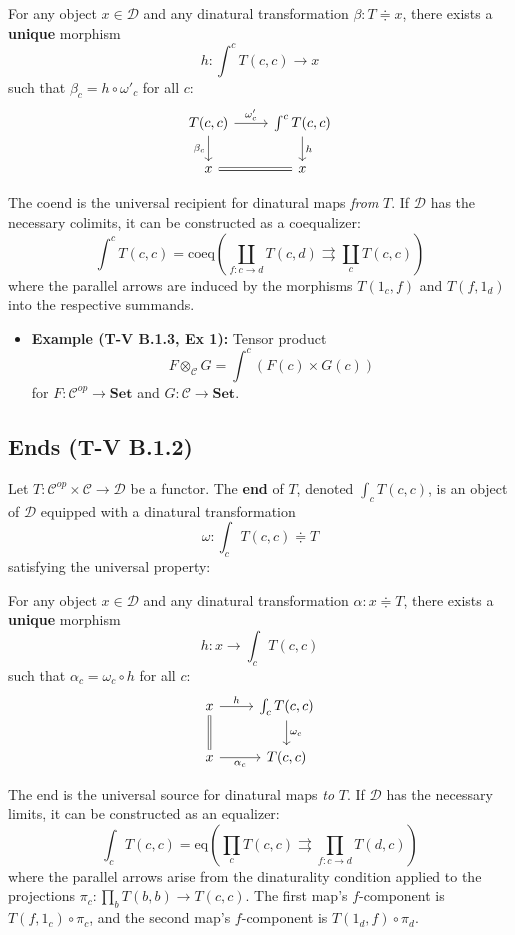 \documentclass[11pt]{article}
\theoremstyle{definition}
\begin{document}
For any object \( x \in \mathcal{D} \) and any dinatural transformation \(\beta : T \Doteq x\), there exists a \textbf{unique} morphism 
\[
h : \int^c T(c, c) \to x
\]
such that \(\beta_c = h \circ \omega'_c\) for all \(c\):
\[
\begin{tikzcd}
T(c,c) \arrow[r, "{\omega'_c}"] \arrow[d, "{\beta_c}"'] & \int^c T(c,c) \arrow[d, "h"] \\
x \arrow[r, equal] & x
\end{tikzcd}
\]

The coend is the universal recipient for dinatural maps \emph{from} \(T\). If \(\mathcal{D}\) has the necessary colimits, it can be constructed as a coequalizer:
\[
\int^c T(c, c) = \mathrm{coeq} \left( \coprod_{f: c \to d} T(c, d) \rightrightarrows \coprod_c T(c,c) \right)
\]
where the parallel arrows are induced by the morphisms \(T(1_c,f)\) and \(T(f,1_d)\) into the respective summands.

\begin{itemize}
    \item \textbf{Example (T-V B.1.3, Ex 1):} Tensor product
    \[
    F \otimes_{\mathcal{C}} G = \int^c (F(c) \times G(c))
    \]
    for \(F: \mathcal{C}^{op} \to \mathbf{Set}\) and \(G: \mathcal{C} \to \mathbf{Set}\).
\end{itemize}

\subsection*{Ends (T-V B.1.2)}

Let \( T: \mathcal{C}^{op} \times \mathcal{C} \to \mathcal{D} \) be a functor. The \textbf{end} of \(T\), denoted \(\int_c T(c, c)\), is an object of \(\mathcal{D}\) equipped with a dinatural transformation
\[
\omega : \int_c T(c, c) \Doteq T
\]
satisfying the universal property:

For any object \( x \in \mathcal{D} \) and any dinatural transformation \(\alpha : x \Doteq T\), there exists a \textbf{unique} morphism 
\[
h : x \to \int_c T(c, c)
\]
such that \(\alpha_c = \omega_c \circ h\) for all \(c\):
\[
\begin{tikzcd}
x \arrow[r, "h"] \arrow[d, equal] & \int_c T(c,c) \arrow[d, "\omega_c"] \\
x \arrow[r, "{\alpha_c}"'] & T(c,c)
\end{tikzcd}
\]

The end is the universal source for dinatural maps \emph{to} \(T\). If \(\mathcal{D}\) has the necessary limits, it can be constructed as an equalizer:
\[
\int_c T(c, c) = \mathrm{eq} \left( \prod_c T(c,c) \rightrightarrows \prod_{f: c \to d} T(d,c) \right)
\]
where the parallel arrows arise from the dinaturality condition applied to the projections \(\pi_c : \prod_b T(b,b) \to T(c,c)\). The first map's \(f\)-component is \( T(f,1_c) \circ \pi_c \), and the second map's \(f\)-component is \( T(1_d,f) \circ \pi_d \).
\end{document}
